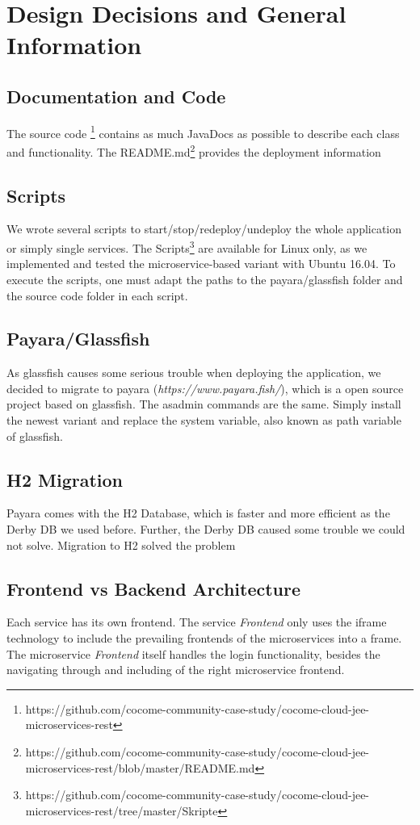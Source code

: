 \chapter{Design Decisions and General Information}
\label{ch:Decisions}

\section{Documentation and Code}
The source code \footnote{https://github.com/cocome-community-case-study/cocome-cloud-jee-microservices-rest} contains as much JavaDocs as possible to describe each class and functionality. The README.md\footnote{https://github.com/cocome-community-case-study/cocome-cloud-jee-microservices-rest/blob/master/README.md} provides the deployment information

\section{Scripts}
We wrote several scripts to start/stop/redeploy/undeploy the whole application or simply single services. The Scripts\footnote{https://github.com/cocome-community-case-study/cocome-cloud-jee-microservices-rest/tree/master/Skripte} are available for Linux only, as we implemented and tested the microservice-based variant with Ubuntu 16.04. To execute the scripts, one must adapt the paths to the payara/glassfish folder and the source code folder in each script.

\section{Payara/Glassfish}
As glassfish causes some serious trouble when deploying the application, we decided to migrate to payara (\textit{https://www.payara.fish/}), which is a open source project based on glassfish. The asadmin commands are the same. Simply install the newest variant and replace the system variable, also known as path variable of glassfish.

\section{H2 Migration}
Payara comes with the H2 Database, which is faster and more efficient as the Derby DB we used before. Further, the Derby DB caused some trouble we could not solve. Migration to H2 solved the problem 

\section{Frontend vs Backend Architecture}
Each service has its own frontend. The service \textit{Frontend} only uses the iframe technology to include the prevailing frontends of the microservices into a frame. The microservice \textit{Frontend} itself handles the login functionality, besides the navigating through and including of the right microservice frontend.

